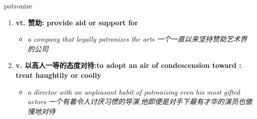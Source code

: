 
\begin{frame}
{\huge patronize}
\begin{center}
\begin{enumerate}\Large
  \item \textbf{vt. 赞助: provide aid or support for}
  \begin{itemize}
    \item \em{\Large{a company that loyally patronizes the arts 一个一直以来坚持赞助艺术界的公司}}
  \end{itemize}
  \item \textbf{v. 以高人一等的态度对待:to adopt an air of condescension toward : treat haughtily or coolly}
  \begin{itemize}
    \item \em{\Large{a director with an unpleasant habit of patronizing even his most gifted actors 一个有着令人讨厌习惯的导演,他即便是对手下最有才华的演员也傲慢地对待}}
  \end{itemize}
\end{enumerate}
\end{center}
\end{frame}
